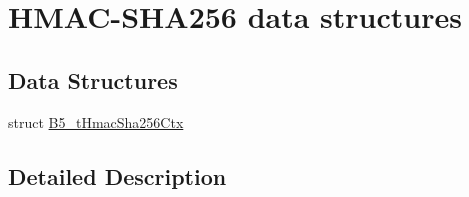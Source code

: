 \hypertarget{group__hmacsha_str}{\section{H\-M\-A\-C-\/\-S\-H\-A256 data structures}
\label{group__hmacsha_str}
}
\subsection*{Data Structures}
\begin{DoxyCompactItemize}
\item 
struct \hyperlink{struct_b5__t_hmac_sha256_ctx}{B5\-\_\-t\-Hmac\-Sha256\-Ctx}
\end{DoxyCompactItemize}


\subsection{Detailed Description}
